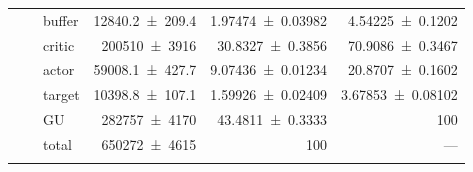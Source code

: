 {\begin{longtable}{@{}lllrrr@{}}
     &  & buffer & \num{12840.2+-209.4} & \num{1.97474+-0.03982} & \num{4.54225+-0.1202} \\
     &  & critic & \num{200510+-3916} & \num{30.8327+-0.3856} & \num{70.9086+-0.3467} \\
     &  & actor & \num{59008.1+-427.7} & \num{9.07436+-0.01234} & \num{20.8707+-0.1602} \\
     &  & target & \num{10398.8+-107.1} & \num{1.59926+-0.02409} & \num{3.67853+-0.08102} \\
     &  & GU & \num{282757+-4170} & \num{43.4811+-0.3333} & 100 \\
     &  & total & \num{650272+-4615} & \num{100} & --- \\
    \addlinespace[2pt]
  \end{longtable}
}
